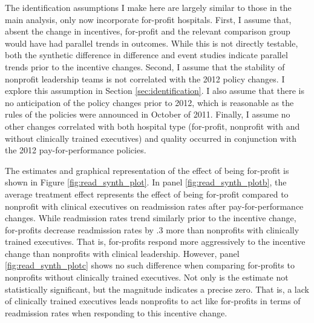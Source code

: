 \documentclass[12pt]{article}
\begin{document}
    The identification assumptions I make here are largely similar to those in the main analysis, only now incorporate for-profit hospitals. First, I assume that, absent the change in incentives, for-profit and the relevant comparison group would have had parallel trends in outcomes. While this is not directly testable, both the synthetic difference in difference and event studies indicate parallel trends prior to the incentive changes. Second, I assume that the stability of nonprofit leadership teams is not correlated with the 2012 policy changes. I explore this assumption in Section \ref{sec:identification}. I also assume that there is no anticipation of the policy changes prior to 2012, which is reasonable as the rules of the policies were announced in October of 2011. Finally, I assume no other changes correlated with both hospital type (for-profit, nonprofit with and without clinically trained executives) and quality occurred in conjunction with the 2012 pay-for-performance policies.

    The estimates and graphical representation of the effect of being for-profit is shown in Figure \ref{fig:read_synth_plot}. In panel \ref{fig:read_synth_plotb}, the average treatment effect represents the effect of being for-profit compared to nonprofit with clinical executives on readmission rates after pay-for-performance changes. While readmission rates trend similarly prior to the incentive change, for-profits decrease readmission rates by .3 more than nonprofits with clinically trained executives. That is, for-profits respond more aggressively to the incentive change than nonprofits with clinical leadership. However, panel \ref{fig:read_synth_plotc} shows no such difference when comparing for-profits to nonprofits without clinically trained executives. Not only is the estimate not statistically significant, but the magnitude indicates a precise zero. That is, a lack of clinically trained executives leads nonprofits to act like for-profits in terms of readmission rates when responding to this incentive change. 
\end{document}
